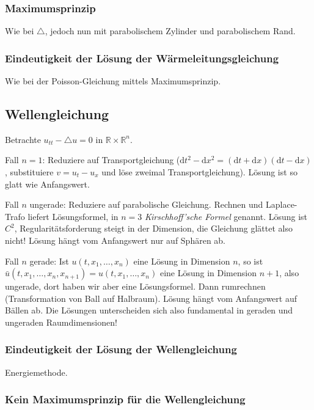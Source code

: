 \documentclass[11pt,a4paper]{scrartcl}
\newcommand{\R}{\mathbb{R}} %
\theoremstyle{plain}
\theoremstyle{definition}
\theoremstyle{remark}
\begin{document}
\subsubsection{Maximumsprinzip}

Wie bei $\triangle$, jedoch nun mit parabolischem Zylinder und parabolischem Rand.

\subsubsection{Eindeutigkeit der Lösung der Wärmeleitungsgleichung}

Wie bei der Poisson-Gleichung mittels Maximumsprinzip.

\subsection{Wellengleichung}

Betrachte $u_{tt}-\triangle u = 0$ in $\R\times \R^n$. 

Fall $n=1$: Reduziere auf Transportgleichung ($\mathrm{d}t^2-\mathrm{d}x^2=(\mathrm{d}t+\mathrm{d}x)(\mathrm{d}t-\mathrm{d}x)$, substituiere $v=u_t-u_x$ und löse zweimal Transportgleichung). Lösung ist so glatt wie Anfangswert. 

Fall $n$ ungerade: Reduziere auf parabolische Gleichung. Rechnen und Laplace-Trafo liefert Lösungsformel, in $n=3$ \emph{Kirschhoff'sche Formel} genannt. Lösung ist $C^2$, Regularitätsforderung steigt in der Dimension, die Gleichung glättet also nicht! Lösung hängt vom Anfangswert nur auf Sphären ab. 

Fall $n$ gerade: Ist $u(t,x_1,\dots,x_n)$ eine Lösung in Dimension $n$, so ist $\bar u(t,x_1,\dots,x_n,x_{n+1})=u(t,x_1,\dots,x_n)$ eine Lösung in Dimension $n+1$, also ungerade, dort haben wir aber eine Lösungsformel. Dann rumrechnen (Transformation von Ball auf Halbraum). Lösung hängt vom Anfangswert auf Bällen ab. Die Lösungen unterscheiden sich also fundamental in geraden und ungeraden Raumdimensionen!

\subsubsection{Eindeutigkeit der Lösung der Wellengleichung}

Energiemethode.

\subsubsection{Kein Maximumsprinzip für die Wellengleichung}
\end{document}
